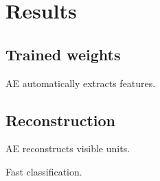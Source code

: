 	\section{Results}
	\subsection{Trained weights}
	AE automatically extracts features.
	
	\subsection{Reconstruction}
	AE reconstructs visible units.
	
	Fast classification.
	
